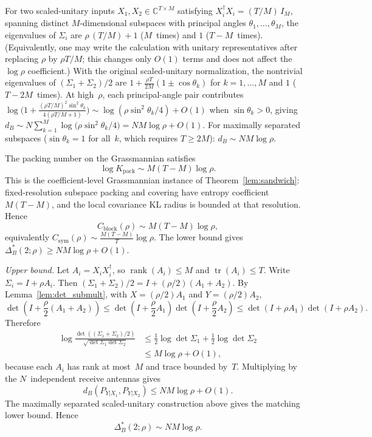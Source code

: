 \documentclass[lettersize,onecolumn]{IEEEtran}
\newcommand{\C}{\mathbb{C}}
\newcommand{\snr}{\rho}
\begin{document}
For two scaled-unitary inputs $X_1, X_2 \in \C^{T\times M}$
satisfying $X_i^\dagger X_i = (T/M)\,I_M$, spanning
distinct $M$-dimensional subspaces with principal angles
$\theta_1,\dots,\theta_M$, the eigenvalues of $\Sigma_i$ are
$\snr\,(T/M)+1$ ($M$~times) and $1$ ($T-M$~times).
(Equivalently, one may write the calculation with unitary
representatives after replacing $\snr$ by $\snr T/M$; this changes
only $O(1)$ terms and does not affect the $\log\snr$ coefficient.)
With the original scaled-unitary normalization, the nontrivial
eigenvalues of $(\Sigma_1+\Sigma_2)/2$ are
$1+\frac{\snr T}{2M}(1\pm\cos\theta_k)$ for $k=1,\dots,M$
and $1$ ($T-2M$~times). At high~$\snr$, each principal-angle
pair contributes
$\log\!\big(1+\frac{(\snr T/M)^2\sin^2\theta_k}{4(\snr T/M+1)}\big)
\sim \log(\snr\sin^2\theta_k/4) + O(1)$
when $\sin\theta_k > 0$, giving
$d_B \sim N\sum_{k=1}^M \log\!\big(\snr\sin^2\theta_k/4\big)
= NM\log\snr + O(1)$.
For maximally separated subspaces ($\sin\theta_k = 1$ for
all~$k$, which requires $T \ge 2M$): $d_B \sim NM\log\snr$.

The packing number on the Grassmannian satisfies
\[
\log K_{\mathrm{pack}} \sim M(T-M)\log\snr.
\]
This is the coefficient-level Grassmannian instance of
Theorem~\ref{lem:sandwich}: fixed-resolution subspace packing and
covering have entropy coefficient $M(T-M)$, and the local covariance
KL radius is bounded at that resolution. Hence
\[
C_{\mathrm{block}}(\snr) \sim M(T-M)\log\snr,
\]
equivalently
$C_{\mathrm{sym}}(\snr) \sim \frac{M(T-M)}{T}\log\snr$.
The lower bound gives
$\Delta_B^*(2;\snr) \ge NM\log\snr + O(1)$.

\emph{Upper bound.} Let $A_i=X_iX_i^\dagger$, so
$\operatorname{rank}(A_i)\le M$ and $\operatorname{tr}(A_i)\le T$.
Write $\Sigma_i=I+\snr A_i$. Then
$(\Sigma_1+\Sigma_2)/2 = I+(\snr/2)(A_1+A_2)$.
By Lemma~\ref{lem:det_submult}, with $X=(\snr/2)A_1$ and
$Y=(\snr/2)A_2$,
\[
    \det\!\left(I+\frac{\snr}{2}(A_1+A_2)\right)
    \le
    \det\!\left(I+\frac{\snr}{2}A_1\right)
    \det\!\left(I+\frac{\snr}{2}A_2\right)
    \le
    \det(I+\snr A_1)\det(I+\snr A_2).
\]
Therefore
\begin{align*}
    \log
    \frac{
        \det((\Sigma_1+\Sigma_2)/2)
    }{
        \sqrt{\det\Sigma_1\det\Sigma_2}
    }
    &\le
    \frac{1}{2}\log\det\Sigma_1
    +
    \frac{1}{2}\log\det\Sigma_2  \\
    &\le
    M\log\snr+O(1),
\end{align*}
because each $A_i$ has rank at most~$M$ and trace bounded by~$T$.
Multiplying by the $N$~independent receive antennas gives
\[
    d_B(P_{Y|X_1},P_{Y|X_2})
    \le
    NM\log\snr+O(1).
\]
The maximally separated scaled-unitary construction above gives the
matching lower bound. Hence
\[
    \Delta_B^*(2;\snr)\sim NM\log\snr.
\]
\end{document}
